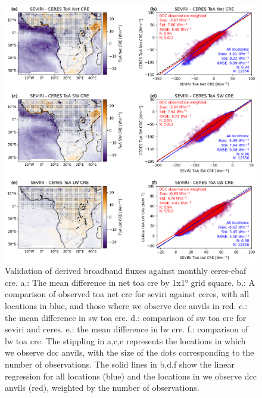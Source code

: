 \begin{figure}[tp]
    \includegraphics[width=\textwidth]{figures/ch3_03.png}
    \caption[
    Validation of derived broadband fluxes against monthly \acrshort{ceres}-\acrshort{ebaf} \acrshort{cre}
    ]{
    Validation of derived broadband fluxes against monthly \acrshort{ceres}-\acrshort{ebaf} \acrshort{cre}. a.: The mean difference in net \acrshort{toa} \acrshort{cre} by 1x1° grid square. b.: A comparison of observed \acrshort{toa} net \acrshort{cre} for \acrshort{seviri} against \acrshort{ceres}, with all locations in blue, and those where we observe \acrshort{dcc} anvils in red. c.: the mean difference in \acrshort{sw} \acrshort{toa} \acrshort{cre}. d.: comparison of \acrshort{sw} \acrshort{toa} \acrshort{cre} for \acrshort{seviri} and \acrshort{ceres}. e.: the mean difference in \acrshort{lw} \acrshort{cre}. f.: comparison of \acrshort{lw} \acrshort{toa} \acrshort{cre}. The stippling in a,c,e represents the locations in which we observe \acrshort{dcc} anvils, with the size of the dots corresponding to the number of observations. The solid lines in b,d,f show the linear regression for all locations (blue) and the locations in we observe \acrshort{dcc} anvils (red), weighted by the number of observations.
    }
    \label{fig:flux_validation}
\end{figure}


